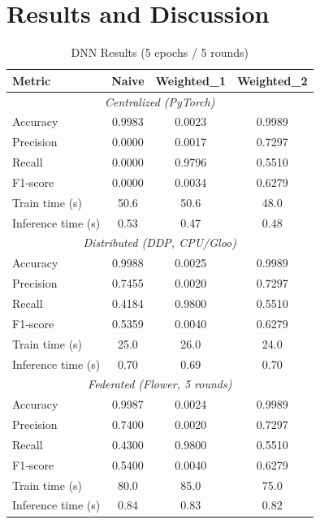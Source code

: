 \documentclass[10pt]{article}
\begin{document}
\section*{Results and Discussion}

\begin{table}[H]
  \centering
  \caption{DNN Results (5 epochs / 5 rounds)}
  \label{tab:results_dnn}
  \begin{tabular}{lccc}
    \toprule
    \textbf{Metric}         & \textbf{Naive} & \textbf{Weighted\_1} & \textbf{Weighted\_2} \\
    \midrule
    \multicolumn{4}{c}{\it Centralized (PyTorch)}\\
    \midrule
    Accuracy                & 0.9983 & 0.0023  & 0.9989  \\
    Precision               & 0.0000 & 0.0017  & 0.7297  \\
    Recall                  & 0.0000 & 0.9796  & 0.5510  \\
    F1‐score                & 0.0000 & 0.0034  & 0.6279  \\
    Train time (s)          & 50.6   & 50.6    & 48.0    \\
    Inference time (s)      & 0.53   & 0.47    & 0.48    \\
    \midrule
    \multicolumn{4}{c}{\it Distributed (DDP, CPU/Gloo)}\\
    \midrule
    Accuracy                & 0.9988 & 0.0025  & 0.9989  \\
    Precision               & 0.7455 & 0.0020  & 0.7297  \\
    Recall                  & 0.4184 & 0.9800  & 0.5510  \\
    F1‐score                & 0.5359 & 0.0040  & 0.6279  \\
    Train time (s)          & 25.0   & 26.0    & 24.0    \\
    Inference time (s)      & 0.70   & 0.69    & 0.70    \\
    \midrule
    \multicolumn{4}{c}{\it Federated (Flower, 5 rounds)}\\
    \midrule
    Accuracy                & 0.9987 & 0.0024  & 0.9989  \\
    Precision               & 0.7400 & 0.0020  & 0.7297  \\
    Recall                  & 0.4300 & 0.9800  & 0.5510  \\
    F1‐score                & 0.5400 & 0.0040  & 0.6279  \\
    Train time (s)          & 80.0   & 85.0    & 75.0    \\
    Inference time (s)      & 0.84   & 0.83    & 0.82    \\
    \bottomrule
  \end{tabular}
\end{table}
\end{document}
